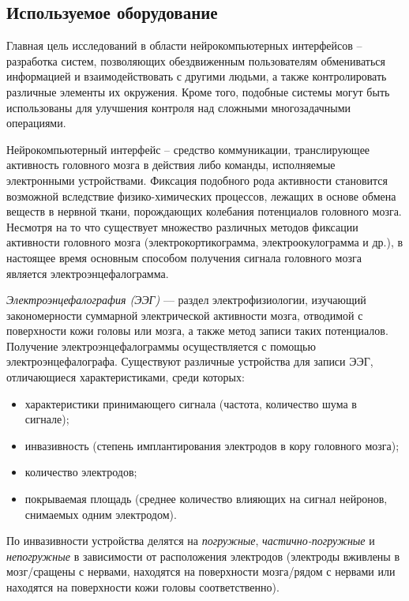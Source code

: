 \documentclass[12pt,fleqn]{article}
\begin{document}
	\subsection{Используемое оборудование}
	\par Главная цель исследований в области нейрокомпьютерных интерфейсов -- разработка систем, позволяющих обездвиженным пользователям обмениваться информацией и взаимодействовать с другими людьми, а также контролировать различные элементы их окружения. Кроме того, подобные системы могут быть использованы для улучшения контроля над сложными многозадачными операциями.
	\par Нейрокомпьютерный интерфейс -- средство коммуникации, транслирующее активность головного мозга в действия либо команды, исполняемые электронными устройствами. Фиксация подобного рода активности становится возможной вследствие физико-химических процессов, лежащих в основе обмена веществ в нервной ткани, порождающих колебания потенциалов головного мозга. Несмотря на то что существует множество различных методов фиксации активности головного мозга (электрокортикограмма, электроокулограмма и др.), в настоящее время основным способом получения сигнала головного мозга является электроэнцефалограмма. 
	\par {\it Электроэнцефалография (ЭЭГ)} — раздел электрофизиологии, изучающий закономерности суммарной электрической активности мозга, отводимой с поверхности кожи головы или мозга, а также метод записи таких потенциалов. Получение электроэнцефалограммы осуществляется с помощью электроэнцефалографа. Существуют различные устройства для записи ЭЭГ, отличающиеся характеристиками, среди которых: 
	\begin{itemize}\itemsep0pt
	\item
	характеристики принимающего сигнала (частота, количество шума в сигнале);
	\item
	инвазивность (степень имплантирования электродов в кору головного мозга);
	\item
	количество электродов;
	\item
	покрываемая площадь (среднее количество влияющих на сигнал нейронов, снимаемых одним электродом).
	\end{itemize}
	\par По инвазивности устройства делятся на {\it погружные}, {\it частично-погружные} и {\it непогружные} в зависимости от расположения электродов (электроды вживлены в мозг/сращены с нервами, находятся на поверхности мозга/рядом с нервами или находятся на поверхности кожи головы соответственно).
\end{document}
